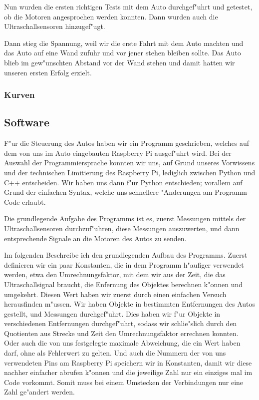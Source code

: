 \documentclass[a4paper,12pt]{article}
\begin{document}
Nun wurden die ersten richtigen Tests mit dem Auto durchgef"uhrt und getestet, ob die Motoren angesprochen werden konnten. Dann wurden auch die Ultraschallsensoren hinzugef"ugt.

Dann stieg die Spannung, weil wir die erste Fahrt mit dem Auto machten und das Auto auf eine Wand zufuhr und vor jener stehen bleiben sollte. Das Auto blieb im gew"unschten Abstand vor der Wand stehen und damit hatten wir unseren ersten Erfolg erzielt.

\subsubsection{Kurven}\label{sec2.1.6}

\subsection{Software}\label{sec2.2}

F"ur die Steuerung des Autos haben wir ein Programm geschrieben, welches auf dem von uns im Auto eingebauten Raspberry Pi ausgef"uhrt wird.
Bei der Auswahl der Programmiersprache konnten wir uns, auf Grund unseres Vorwissens und der technischen Limitierung des Raspberry Pi, lediglich zwischen Python und C++ entscheiden.
Wir haben uns dann f"ur Python entschieden; vorallem auf Grund der einfachen Syntax, welche uns schnellere "Anderungen am Programm-Code erlaubt.

Die grundlegende Aufgabe des Programms ist es, zuerst Messungen mittels der Ultraschallsensoren durchzuf"uhren, diese Messungen auszuwerten, und dann entsprechende Signale an die Motoren des Autos zu senden.

\medskip

Im folgenden Beschreibe ich den grundlegenden Aufbau des Programms.
Zuerst definieren wir ein paar Konstanten, die in dem Programm h"aufiger verwendet werden, etwa den Umrechnungsfaktor, mit dem wir aus der Zeit, die das Ultraschallsignal braucht, die Enfernung des Objektes berechnen k"onnen und umgekehrt.
Diesen Wert haben wir zuerst durch einen einfachen Versuch herausfinden m"ussen.
Wir haben Objekte in bestimmten Entfernungen des Autos gestellt, und Messungen durchgef"uhrt.
Dies haben wir f"ur Objekte in verschiedenen Entfernungen durchgef"uhrt, sodass wir schlie"slich durch den Quotienten aus Strecke und Zeit den Umrechnungsfaktor errechnen konnten.
Oder auch die von uns festgelegte maximale Abweichung, die ein Wert haben darf, ohne als Fehlerwert zu gelten.
Und auch die Nummern der von uns verwendeten Pins am Raspberry Pi speichern wir in Konstanten, damit wir diese nachher einfacher abrufen k"onnen und die jeweilige Zahl nur ein einziges mal im Code vorkommt.
Somit muss bei einem Umstecken der Verbindungen nur eine Zahl ge"andert werden.
\end{document}

